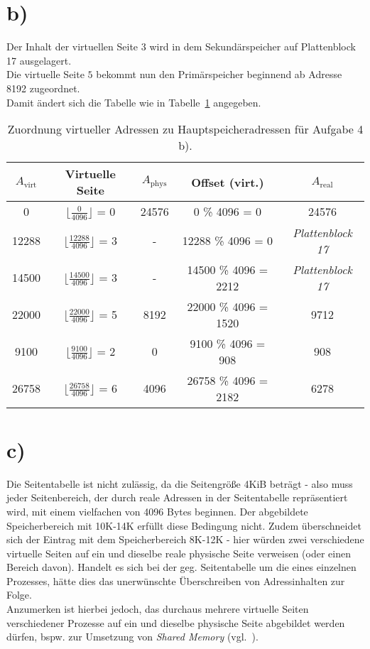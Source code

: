\section{b)}
Der Inhalt der virtuellen Seite $3$ wird in dem Sekundärspeicher auf Plattenblock 17 ausgelagert.\\
Die virtuelle Seite $5$ bekommt nun den Primärspeicher beginnend ab Adresse 8192 zugeordnet.\\
Damit ändert sich die Tabelle wie in  Tabelle~\ref{tab:adresszuordnung_b} angegeben.

\begin{table}[h!]
    \setlength{\tabcolsep}{0.5em}
    \def\arraystretch{1.5}
    \centering
    \begin{tabular}{|c|c|c|c|c|}
        \hline
        $A_{\text{virt}}$ & Virtuelle Seite              & $A_{\text{phys}}$ &  Offset (virt.) & $A_{\text{real}}$\\
        \hline
        0     & $\lfloor \frac{0}{4096} \rfloor$ = 0      & 24576 & 0 \% 4096     = 0     & 24576 \\
        \hline
        12288 & $\lfloor \frac{12288}{4096} \rfloor$ = 3  & -     & 12288 \% 4096 = 0     & \textit{Plattenblock 17} \\
        \hline
        14500  & $\lfloor \frac{14500}{4096} \rfloor$ = 3 & - & 14500 \% 4096 = 2212   & \textit{Plattenblock 17} \\
        \hline
        22000  & $\lfloor \frac{22000}{4096} \rfloor$ = 5 & 8192    & 22000 \% 4096 = 1520   & 9712  \\
        \hline
        9100   & $\lfloor \frac{9100}{4096} \rfloor$ = 2  & 0    & 9100 \% 4096 = 908     & 908\\
        \hline
        26758  & $\lfloor \frac{26758}{4096} \rfloor$ = 6 & 4096 & 26758 \% 4096 = 2182   & 6278 \\
        \hline
    \end{tabular}
    \caption{Zuordnung virtueller Adressen zu Hauptspeicheradressen für Aufgabe 4 b). }
    \label{tab:adresszuordnung_b}
\end{table}

\section{c)}

Die Seitentabelle ist nicht zulässig, da die Seitengröße 4KiB beträgt - also muss jeder Seitenbereich, der durch reale Adressen in der Seitentabelle repräsentiert wird, mit einem vielfachen von 4096 Bytes beginnen.
Der abgebildete Speicherbereich mit 10K-14K erfüllt diese Bedingung nicht.
Zudem überschneidet sich der Eintrag mit dem Speicherbereich 8K-12K - hier würden zwei verschiedene virtuelle Seiten auf ein und dieselbe reale physische Seite verweisen (oder einen Bereich davon).
Handelt es sich bei der geg. Seitentabelle um die eines einzelnen Prozesses, hätte dies das unerwünschte Überschreiben von Adressinhalten zur Folge.\\
Anzumerken ist hierbei jedoch, das durchaus mehrere virtuelle Seiten verschiedener Prozesse auf ein und dieselbe physische Seite abgebildet werden dürfen, bspw. zur Umsetzung von \textit{Shared Memory} (vgl.~\cite[\textbf{Abb. 7.38}, 226]{Man20h}).